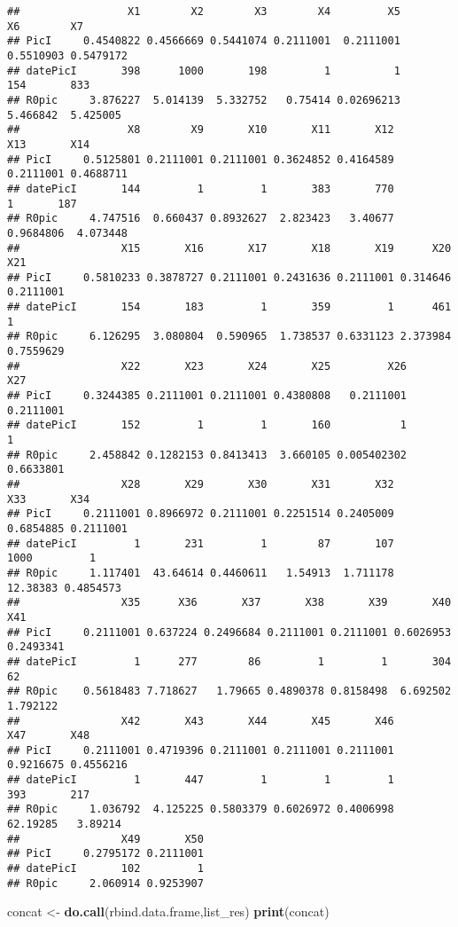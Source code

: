\documentclass[
]{article}
\newenvironment{Shaded}{\begin{snugshade}}{\end{snugshade}}
\newcommand{\KeywordTok}[1]{\textcolor[rgb]{0.13,0.29,0.53}{\textbf{#1}}}
\newcommand{\NormalTok}[1]{#1}
\newcommand{\StringTok}[1]{\textcolor[rgb]{0.31,0.60,0.02}{#1}}
\begin{document}
\begin{verbatim}
##                 X1        X2        X3        X4         X5        X6        X7
## PicI     0.4540822 0.4566669 0.5441074 0.2111001  0.2111001 0.5510903 0.5479172
## datePicI       398      1000       198         1          1       154       833
## R0pic     3.876227  5.014139  5.332752   0.75414 0.02696213  5.466842  5.425005
##                 X8        X9       X10       X11       X12       X13       X14
## PicI     0.5125801 0.2111001 0.2111001 0.3624852 0.4164589 0.2111001 0.4688711
## datePicI       144         1         1       383       770         1       187
## R0pic     4.747516  0.660437 0.8932627  2.823423   3.40677 0.9684806  4.073448
##                X15       X16       X17       X18       X19      X20       X21
## PicI     0.5810233 0.3878727 0.2111001 0.2431636 0.2111001 0.314646 0.2111001
## datePicI       154       183         1       359         1      461         1
## R0pic     6.126295  3.080804  0.590965  1.738537 0.6331123 2.373984 0.7559629
##                X22       X23       X24       X25         X26       X27
## PicI     0.3244385 0.2111001 0.2111001 0.4380808   0.2111001 0.2111001
## datePicI       152         1         1       160           1         1
## R0pic     2.458842 0.1282153 0.8413413  3.660105 0.005402302 0.6633801
##                X28       X29       X30       X31       X32       X33       X34
## PicI     0.2111001 0.8966972 0.2111001 0.2251514 0.2405009 0.6854885 0.2111001
## datePicI         1       231         1        87       107      1000         1
## R0pic     1.117401  43.64614 0.4460611   1.54913  1.711178  12.38383 0.4854573
##                X35      X36       X37       X38       X39       X40       X41
## PicI     0.2111001 0.637224 0.2496684 0.2111001 0.2111001 0.6026953 0.2493341
## datePicI         1      277        86         1         1       304        62
## R0pic    0.5618483 7.718627   1.79665 0.4890378 0.8158498  6.692502  1.792122
##                X42       X43       X44       X45       X46       X47       X48
## PicI     0.2111001 0.4719396 0.2111001 0.2111001 0.2111001 0.9216675 0.4556216
## datePicI         1       447         1         1         1       393       217
## R0pic     1.036792  4.125225 0.5803379 0.6026972 0.4006998  62.19285   3.89214
##                X49       X50
## PicI     0.2795172 0.2111001
## datePicI       102         1
## R0pic     2.060914 0.9253907
\end{verbatim}

\begin{Shaded}
\begin{Highlighting}[]
\NormalTok{concat <-}\StringTok{ }\KeywordTok{do.call}\NormalTok{(rbind.data.frame,list_res)}
\KeywordTok{print}\NormalTok{(concat)}
\end{Highlighting}
\end{Shaded}
\end{document}
